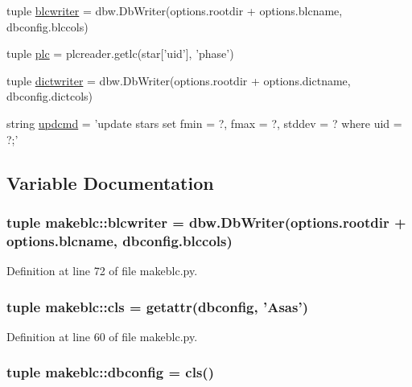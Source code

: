 \begin{DoxyCompactItemize}
\item 
tuple \hyperlink{namespacemakeblc_aafed17d883003aa9d1b25476acf0dcb0}{blcwriter} = dbw.DbWriter(options.rootdir + options.blcname, dbconfig.blccols)
\item 
tuple \hyperlink{namespacemakeblc_af310689cda88b823a447e448e95ee55d}{plc} = plcreader.getlc(star\mbox{[}'uid'\mbox{]}, 'phase')
\item 
tuple \hyperlink{namespacemakeblc_a9cc6d5510f03009615ff8d73f8823bfd}{dictwriter} = dbw.DbWriter(options.rootdir + options.dictname, dbconfig.dictcols)
\item 
string \hyperlink{namespacemakeblc_a7d13b64b84badf069728c58a2165c03d}{updcmd} = 'update stars set fmin = ?, fmax = ?, stddev = ? where uid = ?;'
\end{DoxyCompactItemize}


\subsection{Variable Documentation}
\hypertarget{namespacemakeblc_aafed17d883003aa9d1b25476acf0dcb0}{
\subsubsection[{blcwriter}]{\setlength{\rightskip}{0pt plus 5cm}tuple {\bf makeblc::blcwriter} = dbw.DbWriter(options.rootdir + options.blcname, dbconfig.blccols)}}
\label{namespacemakeblc_aafed17d883003aa9d1b25476acf0dcb0}


Definition at line 72 of file makeblc.py.

\hypertarget{namespacemakeblc_a76c6a65c85e7590a747c0f90985c02c6}{
\subsubsection[{cls}]{\setlength{\rightskip}{0pt plus 5cm}tuple {\bf makeblc::cls} = getattr({\bf dbconfig}, 'Asas')}}
\label{namespacemakeblc_a76c6a65c85e7590a747c0f90985c02c6}


Definition at line 60 of file makeblc.py.

\hypertarget{namespacemakeblc_a69d352c98ad45dc93ce0c036904382ea}{
\subsubsection[{dbconfig}]{\setlength{\rightskip}{0pt plus 5cm}tuple {\bf makeblc::dbconfig} = {\bf cls}()}}
\label{namespacemakeblc_a69d352c98ad45dc93ce0c036904382ea}


